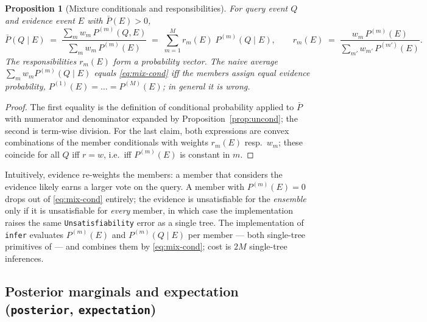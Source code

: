 \documentclass[11pt]{article}
\theoremstyle{plain}
\newtheorem{proposition}[theorem]{Proposition}
\theoremstyle{definition}
\theoremstyle{remark}
\begin{document}
\begin{proposition}[Mixture conditionals and responsibilities]
\label{prop:cond}
For query event $Q$ and evidence event $E$ with $\bar P(E)>0$,
\begin{equation}
\label{eq:mix-cond}
\bar P(Q\mid E)
\;=\;\frac{\sum_m w_m\,P^{(m)}(Q,E)}{\sum_m w_m\,P^{(m)}(E)}
\;=\;\sum_{m=1}^M r_m(E)\;P^{(m)}(Q\mid E),
\qquad
r_m(E)\;=\;\frac{w_m\,P^{(m)}(E)}{\sum_{m'} w_{m'}\,P^{(m')}(E)} .
\end{equation}
The \emph{responsibilities} $r_m(E)$ form a probability vector. The naive
average $\sum_m w_m P^{(m)}(Q\mid E)$ equals \eqref{eq:mix-cond} iff the
members assign equal evidence probability, $P^{(1)}(E)=\dots=P^{(M)}(E)$;
in general it is wrong.
\end{proposition}
\begin{proof}
The first equality is the definition of conditional probability applied
to $\bar P$ with numerator and denominator expanded by
Proposition~\ref{prop:uncond}; the second is term-wise division. For the
last claim, both expressions are convex combinations of the member
conditionals with weights $r_m(E)$ resp.\ $w_m$; these coincide for all
$Q$ iff $r=w$, i.e.\ iff $P^{(m)}(E)$ is constant in $m$.
\end{proof}

Intuitively, evidence re-weights the members: a member that considers the
evidence likely earns a larger vote on the query. A member with
$P^{(m)}(E)=0$ drops out of \eqref{eq:mix-cond} entirely; the evidence is
unsatisfiable for the \emph{ensemble} only if it is unsatisfiable for
\emph{every} member, in which case the implementation raises the same
\texttt{Unsatisfiability} error as a single tree. The implementation of
\texttt{infer} evaluates $P^{(m)}(E)$ and $P^{(m)}(Q\mid E)$ per member
--- both single-tree primitives of \citet{nyga2023jpt} --- and combines
them by \eqref{eq:mix-cond}; cost is $2M$ single-tree inferences.

\subsection{Posterior marginals and expectation
(\texttt{posterior}, \texttt{expectation})}
\end{document}
